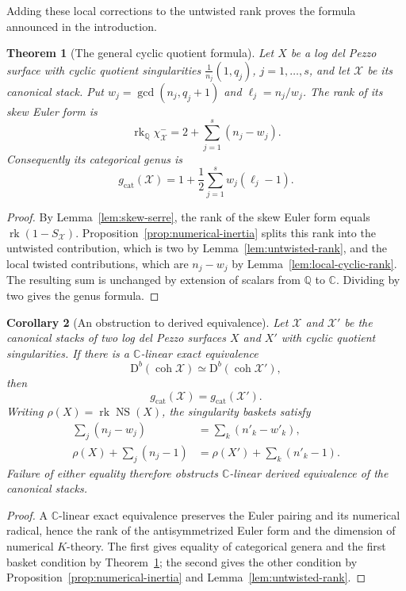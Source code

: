 \documentclass[11pt]{article}
\theoremstyle{plain}
\newtheorem{theorem}{Theorem}[section]
\newtheorem{corollary}[theorem]{Corollary}
\theoremstyle{definition}
\theoremstyle{remark}
\newcommand{\cX}{\mathcal X}
\newcommand{\Db}{\mathrm D^b}
\newcommand{\coh}{\operatorname{coh}}
\newcommand{\NS}{\operatorname{NS}}
\newcommand{\rk}{\operatorname{rk}}
\newcommand{\C}{\mathbb C}
\newcommand{\Q}{\mathbb Q}
\newcommand{\1}{\mathbf 1}
\begin{document}
Adding these local corrections to the untwisted rank proves the formula announced in the introduction.

\begin{theorem}[The general cyclic quotient formula]\label{thm:cyclic-rank}
Let $X$ be a log del Pezzo surface with cyclic quotient singularities $\frac1{n_j}(1,q_j)$, $j=1,\dots,s$, and let $\cX$ be its canonical stack.  Put $w_j=\gcd(n_j,q_j+1)$ and $\ell_j=n_j/w_j$.  The rank of its skew Euler form is
\[
\boxed{
\rk_{\Q}\chi^-_{\cX}
=2+\sum_{j=1}^s(n_j-w_j).}
\]
Consequently its categorical genus is
\[
\boxed{
g_{\mathrm{cat}}(\cX)
=1+\frac12\sum_{j=1}^s w_j(\ell_j-1).}
\]
\end{theorem}

\begin{proof}
By Lemma~\ref{lem:skew-serre}, the rank of the skew Euler form equals $\rk(1-S_{\cX})$.  Proposition~\ref{prop:numerical-inertia} splits this rank into the untwisted contribution, which is two by Lemma~\ref{lem:untwisted-rank}, and the local twisted contributions, which are $n_j-w_j$ by Lemma~\ref{lem:local-cyclic-rank}.  The resulting sum is unchanged by extension of scalars from $\Q$ to $\C$.  Dividing by two gives the genus formula.
\end{proof}

\begin{corollary}[An obstruction to derived equivalence]\label{cor:derived-basket-obstruction}
Let $\mathcal X$ and $\mathcal X'$ be the canonical stacks of two log del Pezzo surfaces $X$ and $X'$ with cyclic quotient singularities.  If there is a $\C$-linear exact equivalence
\[
\Db(\coh\mathcal X)\simeq\Db(\coh\mathcal X'),
\]
then
\[
g_{\mathrm{cat}}(\mathcal X)=g_{\mathrm{cat}}(\mathcal X').
\]
Writing $\rho(X)=\rk\NS(X)$, the singularity baskets satisfy
\[
\begin{aligned}
\sum_j(n_j-w_j)&=\sum_k(n'_k-w'_k),\\
\rho(X)+\sum_j(n_j-1)&=\rho(X')+\sum_k(n'_k-1).
\end{aligned}
\]
Failure of either equality therefore obstructs $\C$-linear derived equivalence of the canonical stacks.
\end{corollary}

\begin{proof}
A $\C$-linear exact equivalence preserves the Euler pairing and its numerical radical, hence the rank of the antisymmetrized Euler form and the dimension of numerical $K$-theory.  The first gives equality of categorical genera and the first basket condition by Theorem~\ref{thm:cyclic-rank}; the second gives the other condition by Proposition~\ref{prop:numerical-inertia} and Lemma~\ref{lem:untwisted-rank}.
\end{proof}
\end{document}
